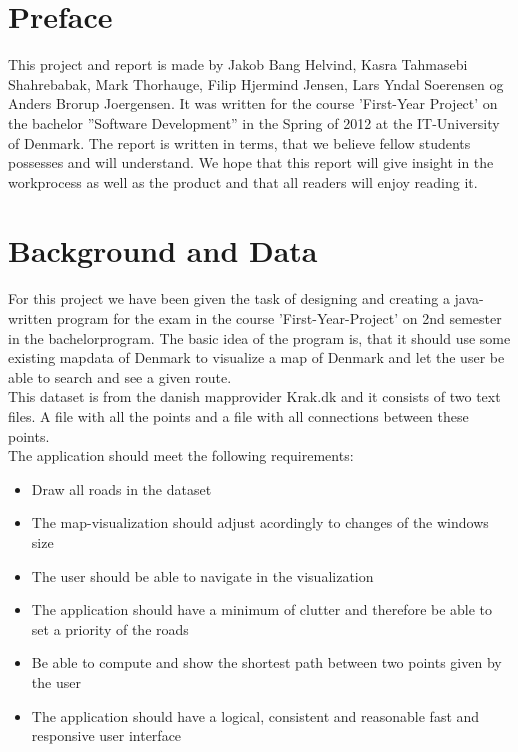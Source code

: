 \documentclass[a4paper,10pt,titlepage]{article}
\begin{document}
	\tableofcontents
	
	\newpage
	\section{Preface}
		This project and report is made by Jakob Bang Helvind, Kasra Tahmasebi Shahrebabak, Mark Thorhauge, Filip Hjermind Jensen, Lars Yndal Soerensen og
		Anders Brorup Joergensen. It was written for the course ’First-Year Project’ on the bachelor ”Software Development” in the Spring of 2012 at the
		IT-University of Denmark. The report is written in terms, that we believe fellow students possesses and will understand. We hope that this 
		report will give insight in the workprocess as well as the product and that all readers will enjoy reading it.
		
	\newpage
	\section{Background and Data}
	
		For this project we have been given the task of designing and creating a java-written program 
		for the exam in the course 'First-Year-Project' on 2nd semester in the bachelorprogram. The basic idea of the 
		program is, that it should use some existing mapdata of Denmark to visualize a map of Denmark and let the user be
		able to search and see a given route. 
		\\This dataset is from the danish mapprovider Krak.dk and it consists of two text files. A file with all the points 
		and a file with all connections between these points.  
		\\The application should meet the following requirements:
		\begin{itemize}
		\item Draw all roads in the dataset
		\item The map-visualization should adjust acordingly to changes of the windows size
		\item The user should be able to navigate in the visualization
		\item The application should have a minimum of clutter and therefore be able to set a priority of the roads
		\item Be able to compute and show the shortest path between two points given by the user
		\item The application should have a logical, consistent and reasonable fast and responsive user interface\\
		\end{itemize}
		
\end{document}
